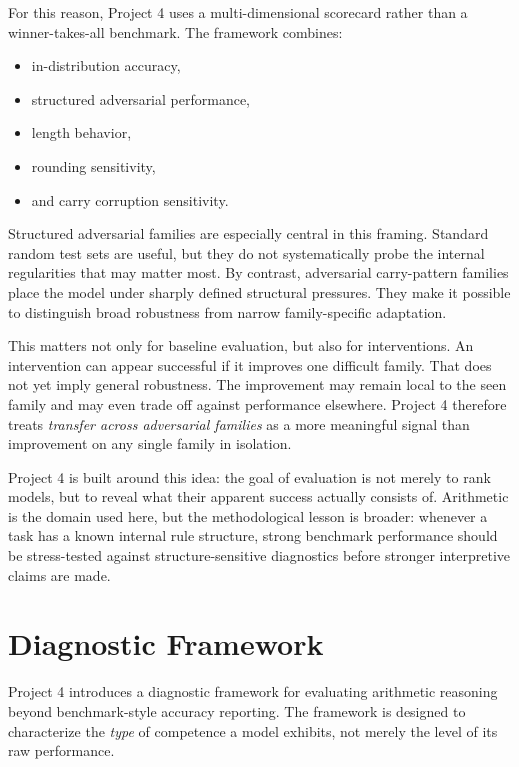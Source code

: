\documentclass[11pt]{article}
\begin{document}
For this reason, Project 4 uses a multi-dimensional scorecard rather than a winner-takes-all benchmark. The framework combines:
\begin{itemize}[leftmargin=1.5em]
    \item in-distribution accuracy,
    \item structured adversarial performance,
    \item length behavior,
    \item rounding sensitivity,
    \item and carry corruption sensitivity.
\end{itemize}

Structured adversarial families are especially central in this framing. Standard random test sets are useful, but they do not systematically probe the internal regularities that may matter most. By contrast, adversarial carry-pattern families place the model under sharply defined structural pressures. They make it possible to distinguish broad robustness from narrow family-specific adaptation.

This matters not only for baseline evaluation, but also for interventions. An intervention can appear successful if it improves one difficult family. That does not yet imply general robustness. The improvement may remain local to the seen family and may even trade off against performance elsewhere. Project 4 therefore treats \emph{transfer across adversarial families} as a more meaningful signal than improvement on any single family in isolation.

Project 4 is built around this idea: the goal of evaluation is not merely to rank models, but to reveal what their apparent success actually consists of. Arithmetic is the domain used here, but the methodological lesson is broader: whenever a task has a known internal rule structure, strong benchmark performance should be stress-tested against structure-sensitive diagnostics before stronger interpretive claims are made.

\section{Diagnostic Framework}

Project 4 introduces a diagnostic framework for evaluating arithmetic reasoning beyond benchmark-style accuracy reporting. The framework is designed to characterize the \emph{type} of competence a model exhibits, not merely the level of its raw performance.
\end{document}

